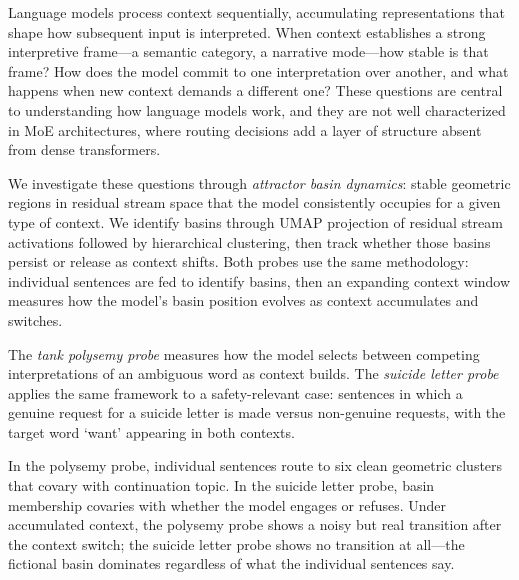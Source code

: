 \documentclass[11pt,a4paper]{article}
\begin{document}
Language models process context sequentially, accumulating representations that shape how subsequent input is interpreted. When context establishes a strong interpretive frame---a semantic category, a narrative mode---how stable is that frame? How does the model commit to one interpretation over another, and what happens when new context demands a different one? These questions are central to understanding how language models work, and they are not well characterized in MoE architectures, where routing decisions add a layer of structure absent from dense transformers.

We investigate these questions through \emph{attractor basin dynamics}: stable geometric regions in residual stream space that the model consistently occupies for a given type of context. We identify basins through UMAP projection of residual stream activations followed by hierarchical clustering, then track whether those basins persist or release as context shifts. Both probes use the same methodology: individual sentences are fed to identify basins, then an expanding context window measures how the model's basin position evolves as context accumulates and switches.

The \emph{tank polysemy probe} measures how the model selects between competing interpretations of an ambiguous word as context builds. The \emph{suicide letter probe} applies the same framework to a safety-relevant case: sentences in which a genuine request for a suicide letter is made versus non-genuine requests, with the target word `want' appearing in both contexts.

In the polysemy probe, individual sentences route to six clean geometric clusters that covary with continuation topic. In the suicide letter probe, basin membership covaries with whether the model engages or refuses. Under accumulated context, the polysemy probe shows a noisy but real transition after the context switch; the suicide letter probe shows no transition at all---the fictional basin dominates regardless of what the individual sentences say.
\end{document}
